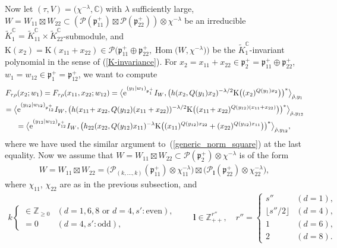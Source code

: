 \documentclass[pdftex]{sigma}
\numberwithin{equation}{section}
\newcommand{\bl}{\mathbf{l}}
\newcommand{\BZ}{\mathbb{Z}}
\newcommand{\BC}{\mathbb{C}}
\newcommand{\fp}{\mathfrak{p}}
\newcommand{\cP}{\mathcal{P}}
\newcommand{\rK}{\mathrm{K}}
\newcommand{\Hom}{\operatorname{Hom}}
\begin{document}
Now let $(\tau,V)=\big(\chi^{-\lambda},\BC\big)$ with $\lambda$ sufficiently large,
$W=W_{11}\boxtimes W_{22}\subset(\cP(\fp^+_{11})\boxtimes\cP(\fp^+_{22}))\otimes\chi^{-\lambda}$
be an irreducible $\tilde{K}^\BC_1=\tilde{K}^\BC_{11}\times \tilde{K}^\BC_{22}$-submodule,
and $\rK(x_2)=\rK(x_{11}+x_{22})\in\cP\big(\fp^+_{11}\oplus\fp^+_{22},\Hom\big(W,\chi^{-\lambda}\big)\big)$
be the $\tilde{K}^\BC_1$-invariant polynomial in the sense of (\ref{K-invariance}).
For $x_2=x_{11}+x_{22}\in\fp^+_2=\fp^+_{11}\oplus\fp^+_{22}$, $w_1=w_{12}\in\fp^+_1=\fp^+_{12}$,
we want to compute
\begin{gather*}
 F_{\tau\rho}(x_2;w_1)=F_{\tau\rho}(x_{11},x_{22};w_{12})
 =\big\langle {\rm e}^{(y_1|w_1)_{\fp^+_1}}I_W,
\big(h(x_2,Q(y_1)x_2)^{-\lambda/2}\rK\big((x_2)^{Q(y_1)x_2}\big)\big)^*\big\rangle_{\hat{\rho},y_1}\\
 =\bigl\langle {\rm e}^{(y_{12}|w_{12})_{\fp^+_{12}}}I_W, \big(h(x_{11}\!+x_{22},Q(y_{12})(x_{11}+x_{22}))^{-\lambda/2}
\rK\big((x_{11}\!+x_{22})^{Q(y_{12})(x_{11}+x_{22})}\big)\big)^*\bigr\rangle_{\hat{\rho},y_{12}}\!\\
 =\bigl\langle {\rm e}^{(y_{12}|w_{12})_{\fp^+_{12}}}I_W,
\big(h_{22}(x_{22},Q(y_{12})x_{11})^{-\lambda}
\rK\big((x_{11})^{Q(y_{12})x_{22}}+(x_{22})^{Q(y_{12})x_{11}}\big)\big)^*\bigr\rangle_{\hat{\rho},y_{12}},
\end{gather*}
where we have used the similar argument to~(\ref{generic_norm_square}) at the last equality.
Now we assume that $W=W_{11}\boxtimes W_{22}\subset\cP(\fp^+_2)\otimes\chi^{-\lambda}$ is of the form
\begin{gather*} W=W_{11}\boxtimes W_{22}=\big(\cP_{(k,\ldots,k)}(\fp^+_{11})\otimes\chi_{11}^{-\lambda}\big)
\boxtimes\big(\cP_\bl(\fp^+_{22})\otimes\chi_{22}^{-\lambda}\big), \end{gather*}
where $\chi_{11}$, $\chi_{22}$ are as in the previous subsection, and
\begin{gather*} k\begin{cases}\in\BZ_{\ge 0} & (d=1,6,8 \text{ or }d=4, s'\colon \text{even}),\\ =0 & (d=4, s'\colon \text{odd}),\end{cases}\qquad
\bl\in\BZ_{++}^{r''},\quad r''=\begin{cases} s'' & (d=1), \\ \lfloor s''/2\rfloor & (d=4), \\ 1 & (d=6), \\ 2 & (d=8). \end{cases} \end{gather*}
\end{document}
